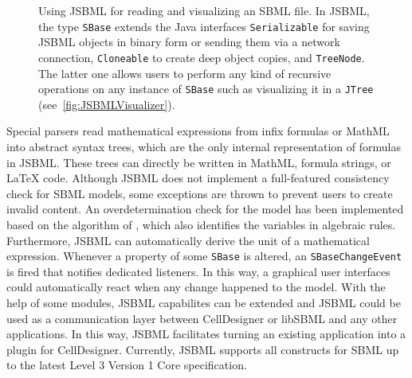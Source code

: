 \documentclass{bioinfo}
\begin{document}
\begin{methods}
\begin{figure}
{{{{\begin{minipage}[t][5.7cm][c]{.55\textwidth}
        \end{minipage}
      }
    }
  }\hspace{1cm}
}
\caption[Using JSBML for reading and visualizing an SBML file using
JSBML]{Using JSBML for reading and visualizing an SBML file. In JSBML, the type
\texttt{SBase} extends the Java interfaces \texttt{Serializable} for saving
JSBML objects in binary form or sending them via a network connection,
\texttt{Cloneable} to create deep object copies, and \texttt{TreeNode}. The
latter one allows users to perform any kind of recursive operations on any
instance of \texttt{SBase} such as visualizing it in a \texttt{JTree}
(see~\ref{fig:JSBMLVisualizer}).}
\label{fig:JSBML}
\end{figure}
Special parsers read mathematical expressions from infix formulas or MathML
into abstract syntax trees, which are the only internal representation
of formulas in JSBML.
These trees can directly be written in MathML, formula strings, or \LaTeX{}
code.
Although JSBML does not implement a full-featured
consistency check for SBML models, some exceptions are thrown to prevent users
to create invalid content. An overdetermination check for the model has been
implemented based on the algorithm of \citet{Hopcroft1973}, which also
identifies the variables in algebraic rules. Furthermore, JSBML can
automatically derive the unit of a mathematical expression.
Whenever a property of some \texttt{SBase} is altered, an
\texttt{SBaseChangeEvent} is fired that notifies dedicated listeners. In this
way, a graphical user interfaces could automatically react when any change
happened to the model. With the help of some modules, JSBML capabilites can be
extended and JSBML could be used as a communication layer between CellDesigner
\citep{Funahashi2003} or libSBML and any other applications. In this way, JSBML
facilitates turning an existing application into a plugin for CellDesigner.
Currently, JSBML supports all constructs for SBML up to the latest Level 3
Version 1 Core specification.
\end{methods}
\end{document}
